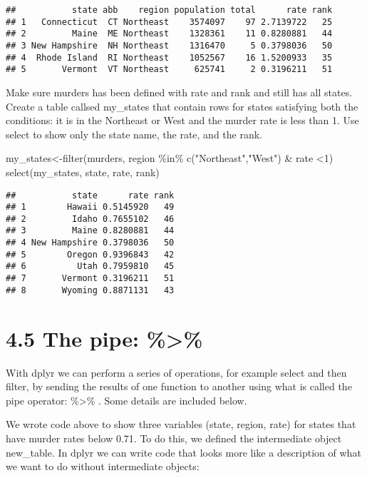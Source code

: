 \documentclass[
]{article}
\newenvironment{Shaded}{\begin{snugshade}}{\end{snugshade}}
\newcommand{\DecValTok}[1]{\textcolor[rgb]{0.00,0.00,0.81}{#1}}
\newcommand{\FunctionTok}[1]{\textcolor[rgb]{0.00,0.00,0.00}{#1}}
\newcommand{\NormalTok}[1]{#1}
\newcommand{\OtherTok}[1]{\textcolor[rgb]{0.56,0.35,0.01}{#1}}
\newcommand{\SpecialCharTok}[1]{\textcolor[rgb]{0.00,0.00,0.00}{#1}}
\newcommand{\StringTok}[1]{\textcolor[rgb]{0.31,0.60,0.02}{#1}}
\begin{document}
\begin{verbatim}
##           state abb    region population total      rate rank
## 1   Connecticut  CT Northeast    3574097    97 2.7139722   25
## 2         Maine  ME Northeast    1328361    11 0.8280881   44
## 3 New Hampshire  NH Northeast    1316470     5 0.3798036   50
## 4  Rhode Island  RI Northeast    1052567    16 1.5200933   35
## 5       Vermont  VT Northeast     625741     2 0.3196211   51
\end{verbatim}

Make sure murders has been defined with rate and rank and still has all
states. Create a table callsed my\_states that contain rows for states
satisfying both the conditions: it is in the Northeast or West and the
murder rate is less than 1. Use select to show only the state name, the
rate, and the rank.

\begin{Shaded}
\begin{Highlighting}[]
\NormalTok{my\_states}\OtherTok{\textless{}{-}}\FunctionTok{filter}\NormalTok{(murders, region }\SpecialCharTok{\%in\%} \FunctionTok{c}\NormalTok{(}\StringTok{"Northeast"}\NormalTok{,}\StringTok{"West"}\NormalTok{) }\SpecialCharTok{\&}\NormalTok{ rate }\SpecialCharTok{\textless{}}\DecValTok{1}\NormalTok{)}
\FunctionTok{select}\NormalTok{(my\_states, state, rate, rank)}
\end{Highlighting}
\end{Shaded}

\begin{verbatim}
##           state      rate rank
## 1        Hawaii 0.5145920   49
## 2         Idaho 0.7655102   46
## 3         Maine 0.8280881   44
## 4 New Hampshire 0.3798036   50
## 5        Oregon 0.9396843   42
## 6          Utah 0.7959810   45
## 7       Vermont 0.3196211   51
## 8       Wyoming 0.8871131   43
\end{verbatim}

\hypertarget{the-pipe}{%
\section{4.5 The pipe: \%\textgreater\%}\label{the-pipe}}

With dplyr we can perform a series of operations, for example select and
then filter, by sending the results of one function to another using
what is called the pipe operator: \%\textgreater\% . Some details are
included below.

We wrote code above to show three variables (state, region, rate) for
states that have murder rates below 0.71. To do this, we defined the
intermediate object new\_table. In dplyr we can write code that looks
more like a description of what we want to do without intermediate
objects:
\end{document}
